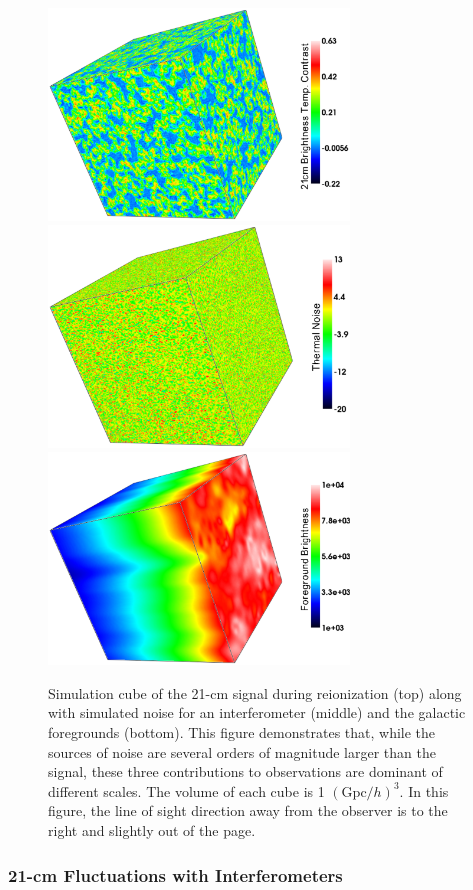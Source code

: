 \begin{figure}[!p]
  \centering
  \includegraphics[width=8cm]{TalkSignal.eps}
  \includegraphics[width=8cm]{TalkNoise.eps}
  \includegraphics[width=8cm]{TalkFG.eps}
  \caption{Simulation cube of the 21-cm signal during reionization (top) along with simulated noise for an interferometer (middle) and the galactic foregrounds (bottom). This figure demonstrates that, while the sources of noise are several orders of magnitude larger than the signal, these three contributions to observations are dominant of different scales. The volume of each cube is 1 $(\text{Gpc}/h)^{3}$. In this figure, the line of sight direction away from the observer is to the right and slightly out of the page. }
  \label{fig:21cmCube}
\end{figure}

\clearpage
\subsubsection{21-cm Fluctuations with Interferometers}\label{sec:21cmFluctuations}


